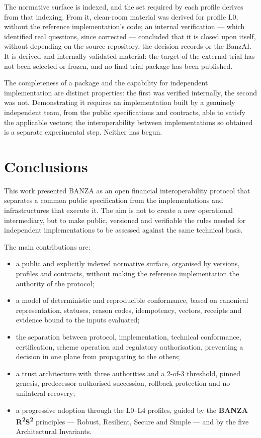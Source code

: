 \documentclass[journal abbreviation, manuscript]{copernicus}
\begin{document}
The normative surface is indexed, and the set required by each profile derives from that indexing. From it, clean-room material was derived for profile L0, without the reference implementation's code; an internal verification --- which identified real questions, since corrected --- concluded that it is closed upon itself, without depending on the source repository, the decision records or the BanzAI. It is derived and internally validated material: the target of the external trial has not been selected or frozen, and no final trial package has been published.

The completeness of a package and the capability for independent implementation are distinct properties: the first was verified internally, the second was not. Demonstrating it requires an implementation built by a genuinely independent team, from the public specifications and contracts, able to satisfy the applicable vectors; the interoperability between implementations so obtained is a separate experimental step. Neither has begun.


\newpage
\section{Conclusions}\label{sec:conclusion}

This work presented BANZA as an open financial interoperability protocol that separates a common public specification from the implementations and infrastructures that execute it. The aim is not to create a new operational intermediary, but to make public, versioned and verifiable the rules needed for independent implementations to be assessed against the same technical basis.

The main contributions are:

\begin{itemize}
  \item a public and explicitly indexed normative surface, organised by versions, profiles and contracts, without making the reference implementation the authority of the protocol;

  \item a model of deterministic and reproducible conformance, based on canonical representation, statuses, reason codes, idempotency, vectors, receipts and evidence bound to the inputs evaluated;

  \item the separation between protocol, implementation, technical conformance, certification, scheme operation and regulatory authorisation, preventing a decision in one plane from propagating to the others;

  \item a trust architecture with three authorities and a 2-of-3 threshold, pinned genesis, predecessor-authorised succession, rollback protection and no unilateral recovery;

  \item a progressive adoption through the L0--L4 profiles, guided by the \textbf{BANZA R\textsuperscript{2}S\textsuperscript{2}} principles --- Robust, Resilient, Secure and Simple --- and by the five Architectural Invariants.
\end{itemize}
\end{document}
